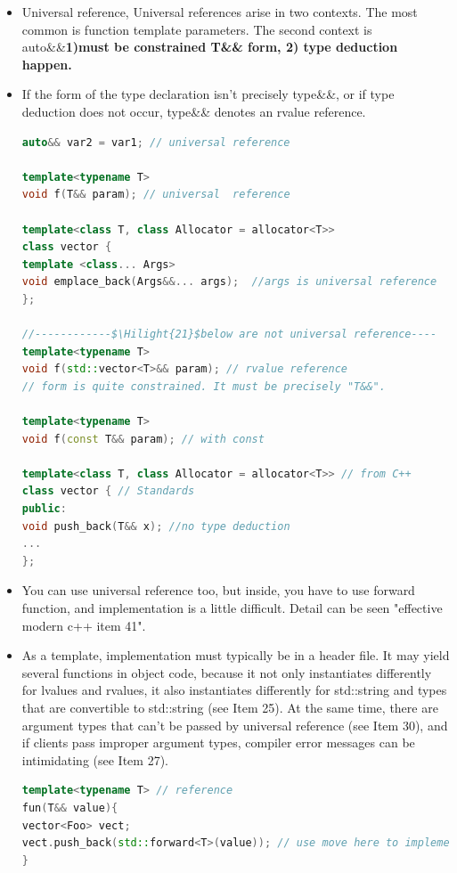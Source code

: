 \documentclass[a4paper,12pt,twoside]{book}
\newcommand{\Hilight}[1]{\makebox[0pt][l]{\color{yellow}\rule[-3pt]{#1em}{11pt}}}
\begin{document}
\begin{itemize}
\item Universal reference, Universal references arise in two contexts. The most common is function template parameters. The second context is auto\&\&\textbf{1)must be constrained T\&\& form, 2) type deduction happen.}

\item If the form of the type declaration isn't precisely type\&\&, or if type deduction
does not occur, type\&\& denotes an rvalue reference.
\begin{lstlisting}[frame=single, language=c++, mathescape=true]
auto&& var2 = var1; // universal reference

template<typename T>
void f(T&& param); // universal  reference

template<class T, class Allocator = allocator<T>>
class vector {
template <class... Args>
void emplace_back(Args&&... args);  //args is universal reference
};

//------------$\Hilight{21}$below are not universal reference----
template<typename T>
void f(std::vector<T>&& param); // rvalue reference
// form is quite constrained. It must be precisely "T&&".

template<typename T>
void f(const T&& param); // with const

template<class T, class Allocator = allocator<T>> // from C++
class vector { // Standards
public:
void push_back(T&& x); //no type deduction
...
};
\end{lstlisting}


\item You can use universal reference too,  but inside, you have to use forward function, and implementation is a little difficult.  Detail can be seen "effective modern c++ item 41".

\item As a template, implementation must typically be in a header file. It may yield several functions in object code, because it not only instantiates differently for lvalues and rvalues, it also instantiates differently for std::string and types that are convertible to std::string (see Item 25). At the same time, there are argument types that can't be passed by universal reference (see Item 30), and if clients pass improper argument types, compiler error messages can be intimidating (see Item 27).
\begin{lstlisting}[frame=single, language=c++]
template<typename T> // reference
fun(T&& value){
vector<Foo> vect;
vect.push_back(std::forward<T>(value)); // use move here to implement
}
\end{lstlisting}


\end{itemize}
\end{document}
